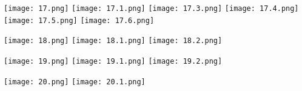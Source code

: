 \documentclass[12pt]{report}
\begin{document}
\newpage
{}
\texttt{[image: 17.png]}
\newline
\texttt{[image: 17.1.png]}
\newline
\texttt{[image: 17.3.png]}
\newline
\texttt{[image: 17.4.png]}
\newline
\texttt{[image: 17.5.png]}
\newline
\texttt{[image: 17.6.png]}
\newline

\newpage
{}
\texttt{[image: 18.png]}
\texttt{[image: 18.1.png]}
\newline
\texttt{[image: 18.2.png]}

\newpage
{}
\texttt{[image: 19.png]}
\texttt{[image: 19.1.png]}
\newline
\texttt{[image: 19.2.png]}


\newpage
{}
\texttt{[image: 20.png]}
\newline
\texttt{[image: 20.1.png]}
\end{document}
